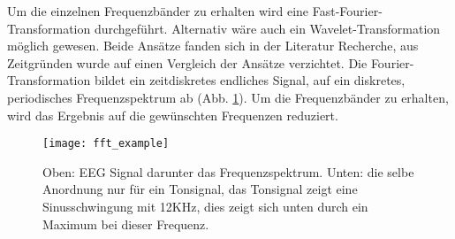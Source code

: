Um die einzelnen Frequenzbänder zu erhalten wird eine Fast-Fourier-Transformation \cite{Bochner_1} durchgeführt. Alternativ wäre auch ein Wavelet-Transformation \cite{Chui:1992:IW:163196} möglich gewesen. Beide Ansätze fanden sich in der Literatur Recherche, aus Zeitgründen wurde auf einen Vergleich der Ansätze verzichtet. 
Die Fourier-Transformation bildet ein zeitdiskretes endliches Signal, auf ein diskretes, periodisches Frequenzspektrum ab (Abb. \ref{fig:fft_example}). Um die Frequenzbänder zu erhalten, wird das Ergebnis auf die gewünschten Frequenzen reduziert.

\begin{figure}[h] 
  \begin{center}
    \texttt{[image: fft\_example]}
    \caption[Fast Fourier Transformation]{Oben: EEG Signal darunter das Frequenzspektrum. Unten: die selbe Anordnung nur für ein Tonsignal, das Tonsignal zeigt eine Sinusschwingung mit 12KHz, dies zeigt sich unten durch ein Maximum bei dieser Frequenz. \label{fig:fft_example}}
  \end{center}
\end{figure}
